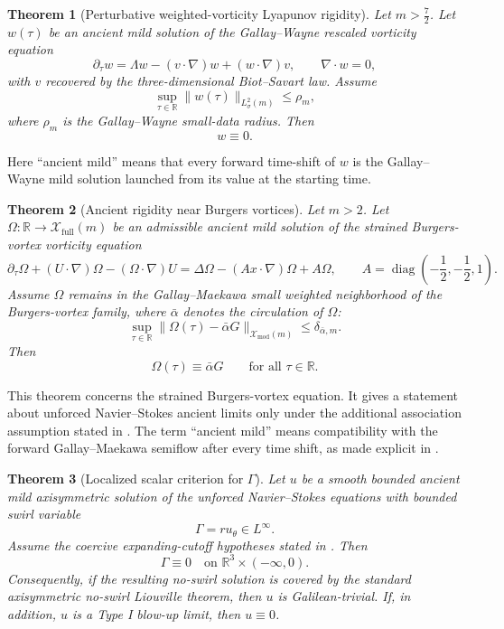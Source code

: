 \documentclass[11pt]{amsart}
\theoremstyle{plain}
\newtheorem{theorem}{Theorem}[section]
\theoremstyle{definition}
\theoremstyle{remark}
\numberwithin{equation}{section}
\begin{document}
\begin{theorem}[Perturbative weighted-vorticity Lyapunov rigidity]
\label{thm:weighted-vorticity-vanishing-intro}
Let \(m>\frac72\).  Let \(w(\tau)\) be an ancient mild solution of the
Gallay--Wayne rescaled vorticity equation
\begin{equation}\label{eq:weighted-vorticity-intro}
   \partial_\tau w
   =
   \Lambda w-(v\cdot\nabla)w+(w\cdot\nabla)v,
   \qquad \nabla\cdot w=0,
\end{equation}
with \(v\) recovered by the three-dimensional Biot--Savart law.  Assume
\[
   \sup_{\tau\in\mathbb R}\|w(\tau)\|_{L^2_\sigma(m)}
   \le \rho_m,
\]
where \(\rho_m\) is the Gallay--Wayne small-data radius.  Then
\[
   w\equiv0.
\]
\end{theorem}

Here ``ancient mild'' means that every forward time-shift of \(w\) is the
Gallay--Wayne mild solution launched from its value at the starting time.

\begin{theorem}[Ancient rigidity near Burgers vortices]
\label{thm:burgers-vortex-rigidity-intro}
Let \(m>2\).  Let
\(\Omega:\mathbb R\to\mathcal X_{\mathrm{full}}(m)\) be an admissible ancient
mild solution of the strained Burgers-vortex vorticity equation
\begin{equation}\label{eq:burgers-intro}
   \partial_\tau\Omega+(U\cdot\nabla)\Omega-(\Omega\cdot\nabla)U
   =
   \Delta\Omega-(Ax\cdot\nabla)\Omega+A\Omega,
   \qquad
   A=\operatorname{diag}\left(-\frac12,-\frac12,1\right).
\end{equation}
Assume \(\Omega\) remains in the Gallay--Maekawa small weighted neighborhood of
the Burgers-vortex family, where \(\bar\alpha\) denotes the circulation of
\(\Omega\):
\[
   \sup_{\tau\in\mathbb R}
   \|\Omega(\tau)-\bar\alpha G\|_{\mathcal X_{\mathrm{mod}}(m)}
   \le
   \delta_{\bar\alpha,m}.
\]
Then
\[
   \Omega(\tau)\equiv\bar\alpha G
   \qquad\text{for all }\tau\in\mathbb R.
\]
\end{theorem}

This theorem concerns the strained Burgers-vortex equation.  It gives a
statement about unforced Navier--Stokes ancient limits only under the
additional association assumption stated in .  The
term ``ancient mild'' means compatibility with the forward Gallay--Maekawa
semiflow after every time shift, as made explicit in .

\begin{theorem}[Localized scalar criterion for \(\Gamma\)]
\label{thm:scalar-flattening-intro}
Let \(u\) be a smooth bounded ancient mild axisymmetric solution of the
unforced Navier--Stokes equations with bounded swirl variable
\[
   \Gamma=ru_\theta\in L^\infty.
\]
Assume the coercive expanding-cutoff hypotheses stated in
.  Then
\[
   \Gamma\equiv0
   \quad\text{on }\mathbb R^3\times(-\infty,0).
\]
Consequently, if the resulting no-swirl solution is covered by the standard
axisymmetric no-swirl Liouville theorem, then \(u\) is Galilean-trivial.  If,
in addition, \(u\) is a Type I blow-up limit, then \(u\equiv0\).
\end{theorem}
\end{document}
